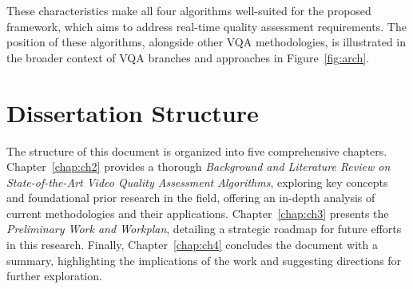 These characteristics make all four algorithms well-suited for the proposed framework, which aims to address real-time quality assessment requirements. The position of these algorithms, alongside other VQA methodologies, is illustrated in the broader context of VQA branches and approaches in Figure~\ref{fig:arch}.

\section{Dissertation Structure} \label{sec:struct}

The structure of this document is organized into five comprehensive chapters. Chapter~\ref{chap:ch2} provides a thorough \textit{Background and Literature Review on State-of-the-Art Video Quality Assessment Algorithms}, exploring key concepts and foundational prior research in the field, offering an in-depth analysis of current methodologies and their applications. Chapter~\ref{chap:ch3} presents the \textit{Preliminary Work and Workplan}, detailing a strategic roadmap for future efforts in this research. Finally, Chapter~\ref{chap:ch4} concludes the document with a summary, highlighting the implications of the work and suggesting directions for further exploration.

